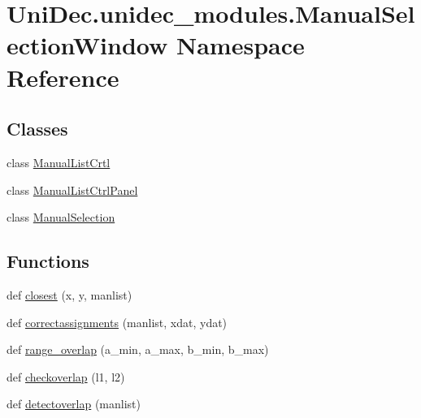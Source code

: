 \hypertarget{namespace_uni_dec_1_1unidec__modules_1_1_manual_selection_window}{}\section{Uni\+Dec.\+unidec\+\_\+modules.\+Manual\+Selection\+Window Namespace Reference}
\label{namespace_uni_dec_1_1unidec__modules_1_1_manual_selection_window}
\subsection*{Classes}
\begin{DoxyCompactItemize}
\item 
class \hyperlink{class_uni_dec_1_1unidec__modules_1_1_manual_selection_window_1_1_manual_list_crtl}{Manual\+List\+Crtl}
\item 
class \hyperlink{class_uni_dec_1_1unidec__modules_1_1_manual_selection_window_1_1_manual_list_ctrl_panel}{Manual\+List\+Ctrl\+Panel}
\item 
class \hyperlink{class_uni_dec_1_1unidec__modules_1_1_manual_selection_window_1_1_manual_selection}{Manual\+Selection}
\end{DoxyCompactItemize}
\subsection*{Functions}
\begin{DoxyCompactItemize}
\item 
def \hyperlink{namespace_uni_dec_1_1unidec__modules_1_1_manual_selection_window_a4bfa801df2ec7a3553d4be14cc00f311}{closest} (x, y, manlist)
\item 
def \hyperlink{namespace_uni_dec_1_1unidec__modules_1_1_manual_selection_window_a52191e29e8da2b32ac2d2890e7c0e0be}{correctassignments} (manlist, xdat, ydat)
\item 
def \hyperlink{namespace_uni_dec_1_1unidec__modules_1_1_manual_selection_window_a72f7382612ffac89a3f83d9df7f264a8}{range\+\_\+overlap} (a\+\_\+min, a\+\_\+max, b\+\_\+min, b\+\_\+max)
\item 
def \hyperlink{namespace_uni_dec_1_1unidec__modules_1_1_manual_selection_window_a3dd3d7b539a377240773b49968d7d7fb}{checkoverlap} (l1, l2)
\item 
def \hyperlink{namespace_uni_dec_1_1unidec__modules_1_1_manual_selection_window_a2ebf78cc6dcfefc590bfea08bcba9130}{detectoverlap} (manlist)
\end{DoxyCompactItemize}
